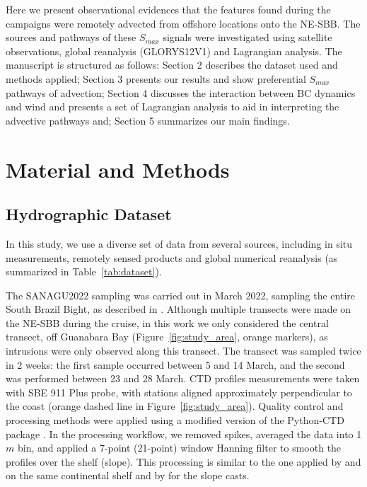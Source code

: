 \documentclass[draft]{agujournal2019}
\begin{document}
Here we present observational evidences that the features found during the campaigns were remotely advected from offshore locations onto the NE-SBB. The sources and pathways of these \textit{$S_{max}$} signals were investigated using satellite observations, global reanalysis (GLORYS12V1) and Lagrangian analysis. The manuscript is structured as follows: Section 2 describes the dataset used and methods applied; Section 3 presents our results and show preferential \textit{$S_{max}$} pathways of advection; Section 4 discusses the interaction between BC dynamics and wind and presents a set of Lagrangian analysis to aid in interpreting the advective pathways and; Section 5 summarizes our main findings. 

\section{Material and Methods}
\label{section:methods}

\subsection{Hydrographic Dataset}
\label{subsec:hydro_dataset}
In this study, we use a diverse set of data from several sources, including in situ measurements, remotely sensed products and global numerical reanalysis (as summarized in Table~\ref{tab:dataset}). 

The SANAGU2022 sampling was carried out in March 2022, sampling the entire South Brazil Bight, as described in . Although multiple transects were made on the NE-SBB during the cruise, in this work we only considered the central transect, off Guanabara Bay (Figure~\ref{fig:study_area}, orange markers), as intrusions were only observed along this transect. The transect was sampled twice in 2 weeks: the first sample occurred between 5 and 14 March, and the second was performed between 23 and 28 March. CTD profiles measurements were taken with SBE 911 Plus probe, with stations aligned approximately perpendicular to the coast (orange dashed line in Figure~\ref{fig:study_area}). Quality control and processing methods were applied using a modified version of the Python-CTD package \cite{Fernandes2014,dottori2023}. In the processing workflow, we removed spikes, averaged the data into 1 $m$ bin, and applied a 7-point (21-point) window Hanning filter to smooth the profiles over the shelf (slope). This processing is similar to the one applied by  and  on the same continental shelf and by  for the slope casts.
\end{document}
